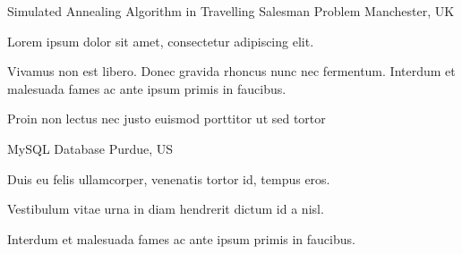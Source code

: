 

\begin{cvprojects}

  \cvproject
    {} %
    {Simulated Annealing Algorithm in Travelling Salesman Problem} %
    {Manchester, UK} %
    {} %
    {
      \begin{cvitems} %
        \item {Lorem ipsum dolor sit amet, consectetur adipiscing elit.}
        \item {Vivamus non est libero. Donec gravida rhoncus nunc nec fermentum. Interdum et malesuada fames ac ante ipsum primis in faucibus.}
        \item {Proin non lectus nec justo euismod porttitor ut sed tortor}
      \end{cvitems}
    }

  \cvproject
    {} %
    {MySQL Database} %
    {Purdue, US} %
    {} %
    {
      \begin{cvitems} %
        \item {Duis eu felis ullamcorper, venenatis tortor id, tempus eros.}
        \item {Vestibulum vitae urna in diam hendrerit dictum id a nisl.}
        \item {Interdum et malesuada fames ac ante ipsum primis in faucibus. }
      \end{cvitems}
    }
\end{cvprojects}
